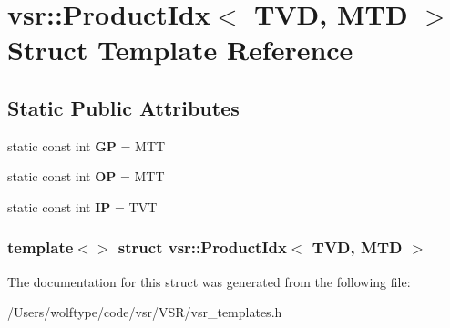 \hypertarget{structvsr_1_1_product_idx_3_01_t_v_d_00_01_m_t_d_01_4}{\section{vsr\-:\-:Product\-Idx$<$ T\-V\-D, M\-T\-D $>$ Struct Template Reference}
\label{structvsr_1_1_product_idx_3_01_t_v_d_00_01_m_t_d_01_4}
}
\subsection*{Static Public Attributes}
\begin{DoxyCompactItemize}
\item 
\hypertarget{structvsr_1_1_product_idx_3_01_t_v_d_00_01_m_t_d_01_4_abcfe15d68f7f724bef7ee9b93dba453f}{static const int {\bfseries G\-P} = M\-T\-T}\label{structvsr_1_1_product_idx_3_01_t_v_d_00_01_m_t_d_01_4_abcfe15d68f7f724bef7ee9b93dba453f}

\item 
\hypertarget{structvsr_1_1_product_idx_3_01_t_v_d_00_01_m_t_d_01_4_a2d433fe9350c2ea158783f76a2c8a99b}{static const int {\bfseries O\-P} = M\-T\-T}\label{structvsr_1_1_product_idx_3_01_t_v_d_00_01_m_t_d_01_4_a2d433fe9350c2ea158783f76a2c8a99b}

\item 
\hypertarget{structvsr_1_1_product_idx_3_01_t_v_d_00_01_m_t_d_01_4_ac005669849316cec4e8d7268fcf1e316}{static const int {\bfseries I\-P} = T\-V\-T}\label{structvsr_1_1_product_idx_3_01_t_v_d_00_01_m_t_d_01_4_ac005669849316cec4e8d7268fcf1e316}

\end{DoxyCompactItemize}
\subsubsection*{template$<$$>$ struct vsr\-::\-Product\-Idx$<$ T\-V\-D, M\-T\-D $>$}



The documentation for this struct was generated from the following file\-:\begin{DoxyCompactItemize}
\item 
/\-Users/wolftype/code/vsr/\-V\-S\-R/vsr\-\_\-templates.\-h\end{DoxyCompactItemize}
